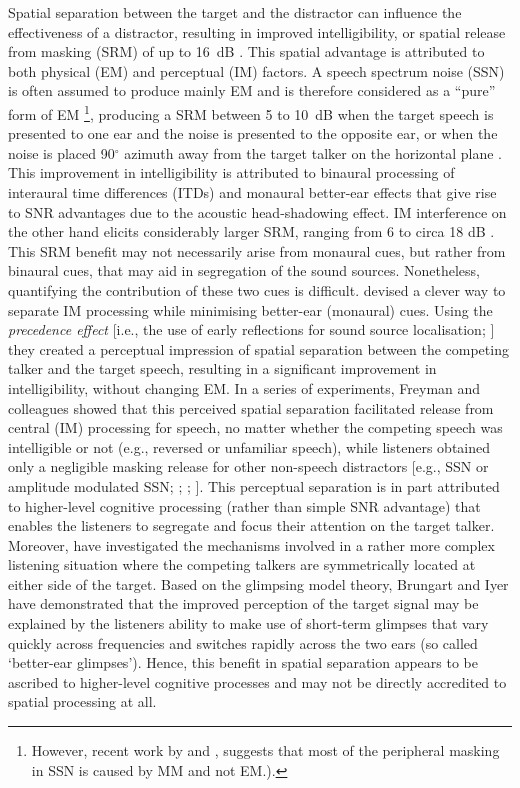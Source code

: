 \documentclass[a4paper, twoside]{templates/ociamthesis}
\begin{document}
Spatial separation between the target and the distractor can influence the effectiveness of a distractor, resulting in improved intelligibility, or spatial release from masking (SRM) of up to 16~dB \autocite{Freyman1999}. This spatial advantage is attributed to both physical (EM) and perceptual (IM) factors. A speech spectrum noise (SSN) is often assumed to produce mainly EM and is therefore considered as a ``pure'' form of EM \autocite{Brungart2001}\footnote{However, recent work by \textcite{Stone2012} and \textcite{Stone2014}, suggests that most of the peripheral masking in SSN is caused by MM and not EM.).}, producing a SRM between 5 to 10~dB when the target speech is presented to one ear and the noise is presented to the opposite ear, or when the noise is placed 90\(^{\circ}\) azimuth away from the target talker on the horizontal plane \autocite[see][]{Best2011}. This improvement in intelligibility is attributed to binaural processing of interaural time differences (ITDs) and monaural better-ear effects that give rise to SNR advantages due to the acoustic head-shadowing effect. IM interference on the other hand elicits considerably larger SRM, ranging from 6 to circa 18 dB \autocite[cf.][]{Best2011}. This SRM benefit may not necessarily arise from monaural cues, but rather from binaural cues, that may aid in segregation of the sound sources. Nonetheless, quantifying the contribution of these two cues is difficult. \textcite{Freyman1999} devised a clever way to separate IM processing while minimising better-ear (monaural) cues. Using the \textit{precedence effect} {[}i.e., the use of early reflections for sound source localisation; \textcite{Hirsh1950}{]} they created a perceptual impression of spatial separation between the competing talker and the target speech, resulting in a significant improvement in intelligibility, without changing EM. In a series of experiments, Freyman and colleagues showed that this perceived spatial separation facilitated release from central (IM) processing for speech, no matter whether the competing speech was intelligible or not (e.g., reversed or unfamiliar speech), while listeners obtained only a negligible masking release for other non-speech distractors {[}e.g., SSN or amplitude modulated SSN; \textcite{Freyman1999}; \textcite{Freyman2001}; \textcite{Freyman2004}{]}. This perceptual separation is in part attributed to higher-level cognitive processing (rather than simple SNR advantage) that enables the listeners to segregate and focus their attention on the target talker. Moreover, \textcite{Brungart2012} have investigated the mechanisms involved in a rather more complex listening situation where the competing talkers are symmetrically located at either side of the target. Based on the glimpsing model theory, Brungart and Iyer have demonstrated that the improved perception of the target signal may be explained by the listeners ability to make use of short-term glimpses that vary quickly across frequencies and switches rapidly across the two ears (so called `better-ear glimpses'). Hence, this benefit in spatial separation appears to be ascribed to higher-level cognitive processes and may not be directly accredited to spatial processing at all.\\
\end{document}
